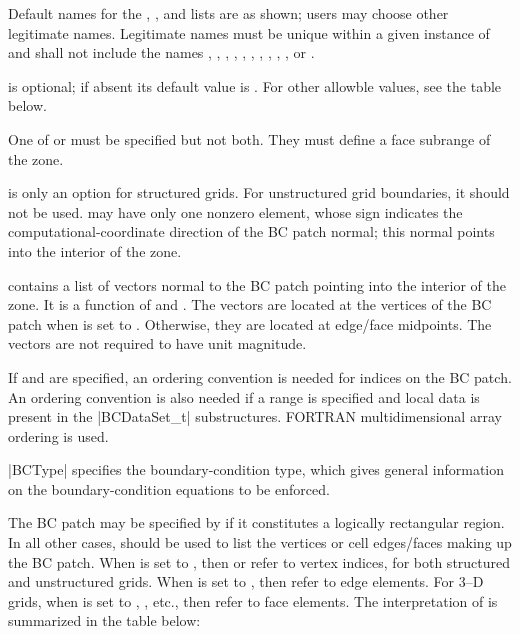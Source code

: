 \begin{notes}
\item Default names for the , , and
      lists are as shown; users may choose other legitimate names.
      Legitimate names must be unique within a given instance
      of  and shall not include the names
      , , ,
      , 
      , , ,
      , , ,
       or .
\item {} is optional; if absent its default value is .
      For other allowble values, see the table below. 
\item One of  or  must be specified but not
     both. They must define a face subrange of the zone.
\item {} is only an option for structured grids.
      For unstructured grid boundaries, it should not be used.
       may have only one nonzero element, whose sign
      indicates the computational-coordinate direction of the BC patch normal;
      this normal points into the interior of the zone.
\item {} contains a list of vectors normal to the BC patch
      pointing into the interior of the zone.
      It is a function of  and .
      The vectors are located at the vertices of the BC patch when
       is set to . Otherwise, they are
      located at edge/face midpoints.
      The vectors are not required to have unit magnitude.
\item If  and  are specified,
      an ordering convention is needed for indices on the BC patch.
      An ordering convention is also needed if a range is specified and
      local data is present in the |BCDataSet_t| substructures.
      FORTRAN multidimensional array ordering is used.
\end{notes}

|BCType| specifies the boundary-condition type, which gives general
information on the boundary-condition equations to be enforced.

The BC patch may be specified by 
if it constitutes a logically rectangular region.
In all other cases,  should be
used to list the vertices or cell edges/faces making up the BC patch.  When
 is set to , then  or
 refer to vertex indices, for both structured and unstructured
grids.  When  is set to , then 
refer to edge elements.  For 3--D grids, when  is set to
, , etc., then  refer
to face elements.  The interpretation of  is summarized
in the table below:

